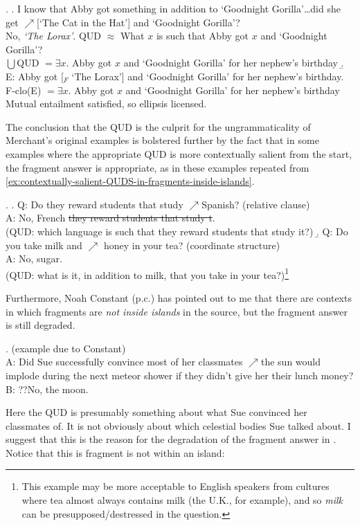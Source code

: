 \documentclass[11pt,letterpaper]{article}
\newcommand{\el}[1]{\sout{#1}}
\begin{document}
\ex. 	\a. I know that Abby got something in addition to `Goodnight Gorilla'\ldots did she get $\nearrow$[`The Cat in the Hat'] and `Goodnight Gorilla'?\\
	No, \emph{`The Lorax'}.
	QUD $\approx$ What $x$ is such that Abby got $x$ and `Goodnight Gorilla'?\\
		$\bigcup$QUD $= \exists x. $ Abby got $x$ and `Goodnight Gorilla' for her nephew's birthday
	\b. E: Abby got [$_F$ `The Lorax'] and `Goodnight Gorilla' for her nephew's birthday.\\
		F-clo(E) $ = \exists x. $ Abby got $x$ and `Goodnight Gorilla' for her nephew's birthday\\
	Mutual entailment satisfied, so ellipsis licensed.
	
The conclusion that the QUD is the culprit for the ungrammaticality of Merchant's original examples is bolstered further by the fact that in some examples where the appropriate QUD is more contextually salient from the start, the fragment answer is appropriate, as in these examples repeated from \ref{ex:contextually-salient-QUDS-in-fragments-inside-islands}.

\ex. 	\a. Q: Do they reward students that study $\nearrow$Spanish? \hfill (relative clause)\\
	    A: No, French \el{they reward students that study t}.\\
	    (QUD: which language is such that they reward students that study it?)
	 \b. Q: Do you take milk and $\nearrow$ honey in your tea? \hfill (coordinate structure)\\
	 	A: No, sugar.\\
	 	(QUD: what is it, in addition to milk, that you take in your tea?)\footnote{This example may be more acceptable to English speakers from cultures where tea almost always contains milk (the U.K., for example), and so {\it milk} can be presupposed/destressed in the question.}
	 	
Furthermore, Noah Constant (p.c.) has pointed out to me that there are contexts in which fragments are \emph{not inside islands} in the source, but the fragment answer is still degraded.

\ex. 	(example due to Constant)\\
	A: Did Sue successfully convince most of her classmates
     $\nearrow$the sun would implode during the next meteor shower if they
     didn't give her their lunch money?\\
B: ??No, the moon.

Here the QUD is presumably something about what Sue convinced her classmates of. It is not obviously about which celestial bodies Sue talked about. I suggest that this is the reason for the degradation of the fragment answer in \Last. Notice that this is fragment is not within an island:
\end{document}
